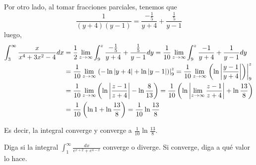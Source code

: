 Por otro lado, al tomar fracciones parciales, tenemos que
\[
  \frac{1}{\left( y+4\right) \left( y-1\right) }=\frac{-\frac{1}{5}}{y+4}+%
  \frac{\frac{1}{5}}{y-1}
\]
luego,
\begin{gather*}
  \begin{aligned}
    \int_{3}^{\infty}\frac{x}{x^{4}+3x^{2}-4}dx&=\frac{1}{2}\lim_{z\rightarrow \infty }\int_{9}^{z}\frac{-\frac{1}{5}}{y+4}+%
    \frac{\frac{1}{5}}{y-1}dy =\frac{1}{10}\lim_{z\rightarrow \infty }\int_{9}^{z}\frac{-1}{y+4}+\frac{1}{%
    y-1}dy \\
    &=\frac{1}{10}\lim_{z\rightarrow \infty }\left.\left( -\ln \left\vert
    y+4\right\vert +\ln \left\vert y-1\right\vert \right)\right\vert_{9}^{z} =\frac{1}{10}\lim_{z\rightarrow \infty }\left.\left( \ln \left\vert \frac{y-1}{y+4}%
    \right\vert \right)\right\vert_{9}^{z} \\
    &=\frac{1}{10}\lim_{z\rightarrow \infty }\left( \ln \left\vert \frac{z-1}{z+4}%
    \right\vert -\ln \frac{8}{13}\right) =\frac{1}{10}\left( \ln \left\vert \lim_{z\rightarrow \infty }\frac{z-1}{z+4}%
    \right\vert +\ln \frac{13}{8}\right) \\
    &=\frac{1}{10}\left( \ln 1+\ln \frac{13}{8}\right) =\frac{1}{10}\ln \frac{13}{8}
  \end{aligned}
\end{gather*}

Es decir, la integral converge y converge a $\frac{1}{10}\ln \frac{13}{8}$.

\begin{ejemplo}
  Diga si la integral $\int_{1}^{\infty}\frac{dx}{e^{x+2}+e^{4-x}}$ converge o diverge. Si converge, diga a qué valor lo hace.
\end{ejemplo}

